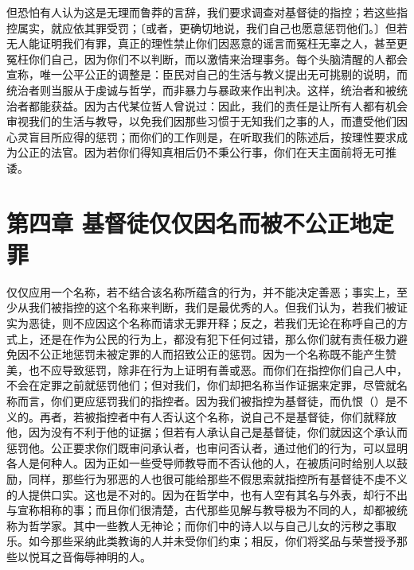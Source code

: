 但恐怕有人认为这是无理而鲁莽的言辞，我们要求调查对基督徒的指控；若这些指控属实，就应依其罪受罚；〔或者，更确切地说，我们自己也愿意惩罚他们。〕但若无人能证明我们有罪，真正的理性禁止你们因恶意的谣言而冤枉无辜之人，甚至更冤枉你们自己，因为你们不以判断，而以激情来治理事务。每个头脑清醒的人都会宣称，唯一公平公正的调整是：臣民对自己的生活与教义提出无可挑剔的说明，而统治者则当服从于虔诚与哲学，而非暴力与暴政来作出判决。这样，统治者和被统治者都能获益。因为古代某位哲人曾说过：因此，我们的责任是让所有人都有机会审视我们的生活与教导，以免我们因那些习惯于无知我们之事的人，而遭受他们因心灵盲目所应得的惩罚；而你们的工作则是，在听取我们的陈述后，按理性要求成为公正的法官。因为若你们得知真相后仍不秉公行事，你们在天主面前将无可推诿。\par


\section{第四章 基督徒仅仅因名而被不公正地定罪}

仅仅应用一个名称，若不结合该名称所蕴含的行为，并不能决定善恶；事实上，至少从我们被指控的这个名称来判断，我们是最优秀的人。但我们认为，若我们被证实为恶徒，则不应因这个名称而请求无罪开释；反之，若我们无论在称呼自己的方式上，还是在作为公民的行为上，都没有犯下任何过错，那么你们就有责任极力避免因不公正地惩罚未被定罪的人而招致公正的惩罚。因为一个名称既不能产生赞美，也不应导致惩罚，除非在行为上证明有善或恶。而你们在指控你们自己人中，不会在定罪之前就惩罚他们；但对我们，你们却把名称当作证据来定罪，尽管就名称而言，你们更应惩罚我们的指控者。因为我们被指控为基督徒，而仇恨（）是不义的。再者，若被指控者中有人否认这个名称，说自己不是基督徒，你们就释放他，因为没有不利于他的证据；但若有人承认自己是基督徒，你们就因这个承认而惩罚他。公正要求你们既审问承认者，也审问否认者，通过他们的行为，可以显明各人是何种人。因为正如一些受导师教导而不否认他的人，在被质问时给别人以鼓励，同样，那些行为邪恶的人也很可能给那些不假思索就指控所有基督徒不虔不义的人提供口实。这也是不对的。因为在哲学中，也有人空有其名与外表，却行不出与宣称相称的事；而且你们很清楚，古代那些见解与教导极为不同的人，却都被统称为哲学家。其中一些教人无神论；而你们中的诗人以与自己儿女的污秽之事取乐。如今那些采纳此类教诲的人并未受你们约束；相反，你们将奖品与荣誉授予那些以悦耳之音侮辱神明的人。\par

